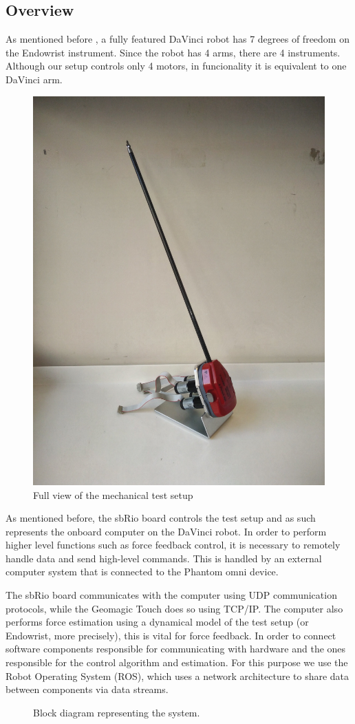 \documentclass[conference]{IEEEtran}
\begin{document}
\subsection{Overview}
As mentioned before , a fully featured DaVinci robot has 7 degrees of freedom on the Endowrist instrument.
Since the robot has 4 arms, there are 4 instruments.
Although our setup controls only 4 motors, in funcionality it is equivalent to one DaVinci arm.

\begin{figure}
		\centering
		\includegraphics[width=0.4\linewidth]{Test_setup4.jpg}
		\caption{Full view of the mechanical test setup}
		\label{fig:Mec_d}
\end{figure}

As mentioned before, the sbRio board controls the test setup and as such represents the onboard computer on the DaVinci robot.
In order to perform higher level functions such as force feedback control, it is necessary to remotely handle data and send high-level commands.
This is handled by an external computer system that is connected to the Phantom omni device.

The sbRio board communicates with the computer using UDP communication protocols, while the Geomagic Touch does so using TCP/IP.
The computer also performs force estimation using a dynamical model of the test setup (or Endowrist, more precisely), this is vital for force feedback.
In order to connect software components responsible for communicating with hardware and the ones responsible for the control algorithm and estimation.
For this purpose we use the Robot Operating System (ROS), which uses a network architecture to share data between components via data streams.

\begin{figure}[h]
\centering
{}
\caption{Block diagram representing the system.}
\end{figure}
\end{document}

